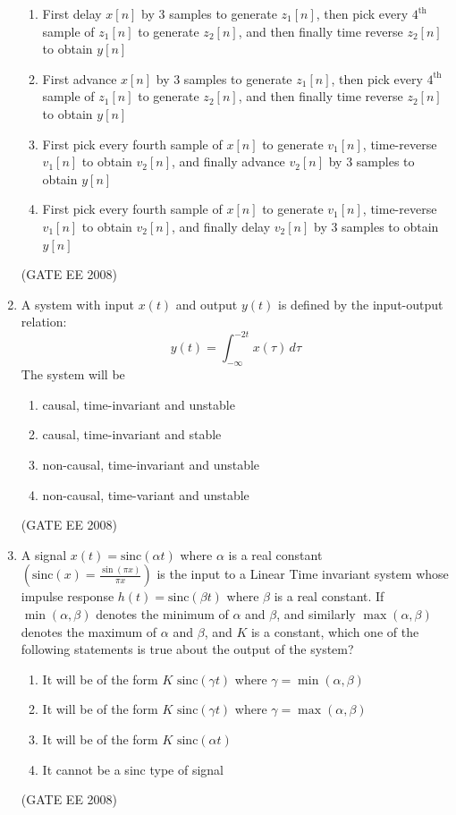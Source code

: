 \documentclass[journal,12pt,onecolumn]{IEEEtran}
\theoremstyle{remark}
\begin{document}
\begin{enumerate}[start=1, label=Q.\arabic*]
\begin{enumerate}[label=(\Alph*)]
    \item First delay $x[n]$ by 3 samples to generate $z_{1}[n]$, then pick every $4^{\text{th}}$ sample of $z_{1}[n]$ to generate $z_{2}[n]$, and then finally time reverse $z_{2}[n]$ to obtain $y[n]$
    \item First advance $x[n]$ by 3 samples to generate $z_{1}[n]$, then pick every $4^{\text{th}}$ sample of $z_{1}[n]$ to generate $z_{2}[n]$, and then finally time reverse $z_{2}[n]$ to obtain $y[n]$
    \item First pick every fourth sample of $x[n]$ to generate $v_{1}[n]$, time-reverse $v_{1}[n]$ to obtain $v_{2}[n]$, and finally advance $v_{2}[n]$ by 3 samples to obtain $y[n]$
    \item First pick every fourth sample of $x[n]$ to generate $v_{1}[n]$, time-reverse $v_{1}[n]$ to obtain $v_{2}[n]$, and finally delay $v_{2}[n]$ by 3 samples to obtain $y[n]$
\end{enumerate}
\hfill (GATE EE 2008)


\item A system with input $x(t)$ and output $y(t)$ is defined by the input-output relation:
$$
y(t) = \int_{-\infty}^{-2t} x(\tau) \,d\tau
$$
The system will be

\begin{enumerate}[label=(\Alph*)]
    \item causal, time-invariant and unstable
    \item causal, time-invariant and stable
    \item non-causal, time-invariant and unstable
    \item non-causal, time-variant and unstable
\end{enumerate}
\hfill (GATE EE 2008)


\item A signal $x(t)=\text{sinc}(\alpha t)$ where $\alpha$ is a real constant $\left(\text{sinc}(x) = \frac{\sin(\pi x)}{\pi x}\right)$ is the input to a Linear Time invariant system whose impulse response $h(t)=\text{sinc}(\beta t)$ where $\beta$ is a real constant. If $\min(\alpha, \beta)$ denotes the minimum of $\alpha$ and $\beta$, and similarly $\max(\alpha, \beta)$ denotes the maximum of $\alpha$ and $\beta$, and $K$ is a constant, which one of the following statements is true about the output of the system?

\begin{enumerate}[label=(\Alph*)]
    \item It will be of the form $K \text{ sinc}(\gamma t)$ where $\gamma=\min(\alpha, \beta)$
    \item It will be of the form $K \text{ sinc}(\gamma t)$ where $\gamma=\max(\alpha, \beta)$
    \item It will be of the form $K \text{ sinc}(\alpha t)$
    \item It cannot be a sinc type of signal
\end{enumerate}
\hfill (GATE EE 2008)


\end{enumerate}
\end{document}
